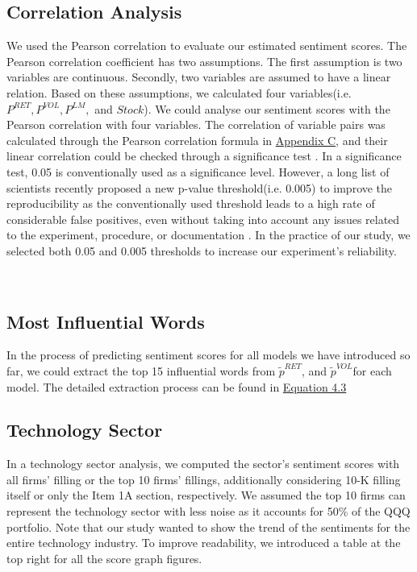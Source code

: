 \documentclass[logo,bsc,singlespacing,parskip]{infthesis}
\begin{document}
\subsection{Correlation Analysis}
\label{correlation}
We used the Pearson correlation to evaluate our estimated sentiment scores. The Pearson correlation coefficient has two assumptions\cite{PearsonCorrelationAssumptions2023}. The first assumption is two variables are continuous. Secondly, two variables are assumed to have a linear relation. Based on these assumptions, we calculated four variables(i.e. $P^{RET}, P^{VOL}, P^{LM},$ and $ Stock $). We could analyse our sentiment scores with the Pearson correlation with four variables. The correlation of variable pairs was calculated through the Pearson correlation formula in \hyperref[pearson-formula]{Appendix C}, and their linear correlation could be checked through a significance test \cite{NCLHypothesisTesting}. In a significance test, 0.05 is conventionally used as a significance level. However, a long list of scientists recently proposed a new p-value threshold(i.e. 0.005) to improve the reproducibility as the conventionally used threshold leads to a high rate of considerable false positives, even without taking into account any issues related to the experiment, procedure, or documentation \cite{Benjamin2017Redefine}. In the practice of our study, we selected both 0.05 and 0.005 thresholds to increase our experiment's reliability. 

\\

\subsection{Most Influential Words}
In the process of predicting sentiment scores for all models we have introduced so far, we could extract the top 15 influential words from $\tilde{p}^{RET}$, and  $\tilde{p}^{VOL}$for each model.
The detailed extraction process can be found in \hyperref[4.3]{Equation 4.3}
\subsection{Technology Sector}
In a technology sector analysis, we computed the sector’s sentiment scores with all firms’ filling or the top 10 firms’ fillings, additionally considering 10-K filling itself or only the Item 1A section, respectively. We assumed the top 10 firms can represent the technology sector with less noise as it accounts for 50\% of the QQQ portfolio. Note that our study wanted to show the trend of the sentiments for the entire technology industry. To improve readability, we introduced a table at the top right for all the score graph figures. 
\end{document}

